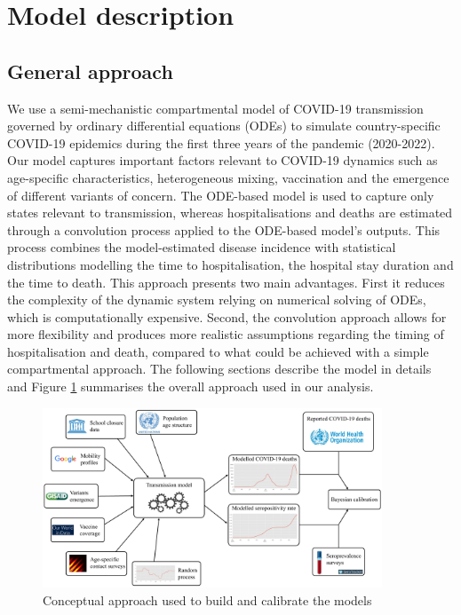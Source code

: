 
\section{Model description}

\subsection{General approach}
We use a semi-mechanistic compartmental model of COVID-19 transmission governed by ordinary differential equations (ODEs) to
simulate country-specific COVID-19 epidemics during the first three years of the pandemic (2020-2022). 
Our model captures important factors relevant to COVID-19 dynamics such as age-specific characteristics, 
heterogeneous mixing, vaccination and the emergence of different variants of concern. 
The ODE-based model is used to capture only states relevant to transmission, whereas hospitalisations and deaths are
estimated through a convolution process applied to the ODE-based model's outputs. This process combines the model-estimated disease incidence with 
statistical distributions modelling the time to hospitalisation, the hospital stay duration and the time to death.
This approach presents two main advantages. First it reduces the complexity of the dynamic system relying on 
numerical solving of ODEs, which is computationally expensive. Second, the convolution approach allows for more flexibility 
and produces more realistic assumptions regarding the timing of hospitalisation and death, 
compared to what could be achieved with a simple compartmental approach. The following sections describe the model in details
and Figure \ref{fig:concept} summarises the overall approach used in our analysis.

\begin{figure}[ht]
    \begin{center}
    \includegraphics[width=0.9\textwidth]{../../tex_descriptions/models/sm_covid/Conceptual_approach.pdf}
    \end{center}
    \caption{Conceptual approach used to build and calibrate the models} 
    \label{fig:concept}
\end{figure}

